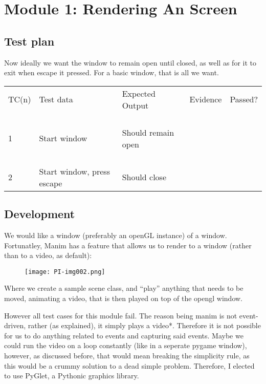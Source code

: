 \documentclass{article}
\begin{document}
\section{Module 1: Rendering An Screen}

\bigskip


\bigskip

\subsection{Test plan}
Now ideally we want the window to remain open until closed, as well as for it to exit when escape it pressed. For a
basic window, that is all we want.

\begin{center}
\tablefirsthead{}
\tablehead{}
\tabletail{}
\tablelasttail{}
\begin{supertabular}{m{1.091cm}m{5.307cm}m{4.598cm}m{2.504cm}m{2.501cm}}
TC(n) &
Test data &
Expected Output &
Evidence &
Passed?\\
1 &
Start window &
Should remain open &
~
 &
~

~
\\
2 &
Start window, press escape &
Should close &
~
 &
~
\\
\end{supertabular}
\end{center}

\bigskip


\bigskip


\bigskip

\subsection{Development}

\bigskip

We would like a window (preferably an openGL instance) of a window. Fortunatley, Manim has a feature that allows us to
render to a window (rather than to a video, as default):



\begin{figure}
\texttt{[image: PI-img002.png]}\end{figure}
Where we create a sample scene class, and “play” anything that needs to be moved, animating a video, that is then played
on top of the opengl window.


\bigskip

However all test cases for this module fail. The reason being manim is not event-driven, rather (as explained), it
simply plays a video*. Therefore it is not possible for us to do anything related to events and capturing said events.
Maybe we could run the video on a loop constantly (like in a seperate pygame window), however, as discussed before,
that would mean breaking the simplicity rule, as this would be a crummy solution to a dead simple problem. Therefore, I
elected to use PyGlet, a Pythonic graphics library.
\end{document}

